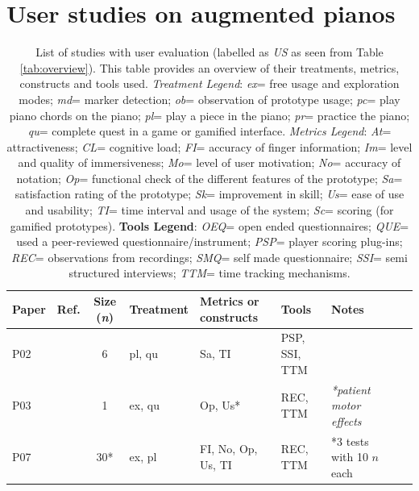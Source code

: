 \documentclass[sigconf, screen, review]{acmart}
\begin{document}
\section{User studies on augmented pianos}
\begin{table}[t]
\caption{List of studies with user evaluation (labelled as \textit{US} as seen from Table \ref{tab:overview}). This table provides an overview of their treatments, metrics, constructs and tools used. \textit{Treatment Legend}: \textit{ex}= free usage and exploration modes; \textit{md}= marker detection; \textit{ob}= observation of prototype usage; \textit{pc}= play piano chords on the piano;  \textit{pl}= play a piece in the piano; \textit{pr}= practice the piano; \textit{qu}= complete quest in a game or gamified interface.  \textit{Metrics Legend}:   \textit{At}= attractiveness; \textit{CL}= cognitive load; \textit{FI}= accuracy of finger information; \textit{Im}= level and quality of immersiveness; \textit{Mo}= level of user motivation; \textit{No}= accuracy of notation; \textit{Op}= functional check of the different features of the prototype; \textit{Sa}= satisfaction rating of the prototype; \textit{Sk}= improvement in skill; \textit{Us}= ease of use and usability; \textit{TI}= time interval and usage of the system; \textit{Sc}= scoring (for gamified prototypes). \textbf{Tools Legend}: \textit{OEQ}= open ended questionnaires; \textit{QUE}= used a peer-reviewed questionnaire/instrument; \textit{PSP}= player scoring plug-ins; \textit{REC}= observations from recordings; \textit{SMQ}= self made questionnaire; \textit{SSI}= semi structured interviews; \textit{TTM}= time tracking mechanisms. }
\label{tab:us-all}
\small\begin{tabularx}{\textwidth}{llclllllX} \toprule
\textbf{Paper} & \textbf{Ref.} & \textbf{Size} (\textit{n})    & \textbf{Treatment}    & \textbf{Metrics or constructs}    & \textbf{Tools} & \textbf{Notes }\\ \midrule
P02 &\cite{schmalstieg2007experiences}    & 6            & pl, qu      & Sa, TI                 & PSP, SSI, TTM         & \\ \hline 
P03 &\cite{correa2009computer}            & 1            & ex, qu      & Op, Us*                & REC, TTM              & \textit{*patient motor effects} \\ \hline 
P07 &\cite{mcpherson2011multidimensional} & 30*           & ex, pl      & FI, No, Op, Us, TI     & REC, TTM              & *3 tests with 10 $n$ each  \\ \hline

\end{tabularx}
\end{table}
\end{document}
